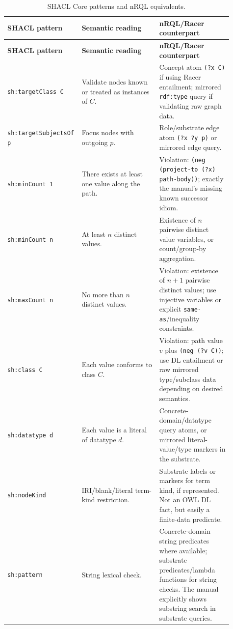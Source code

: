 \documentclass[11pt,letterpaper]{article}
\newcommand{\owl}{OWL}
\begin{document}
\begin{longtable}{p{0.25\linewidth}p{0.34\linewidth}p{0.32\linewidth}}
\caption{SHACL Core patterns and nRQL equivalents.}\label{tab:translation}\\
\toprule
\textbf{SHACL pattern} & \textbf{Semantic reading} & \textbf{nRQL/Racer counterpart} \\
\midrule
\endfirsthead
\toprule
\textbf{SHACL pattern} & \textbf{Semantic reading} & \textbf{nRQL/Racer counterpart} \\
\midrule
\endhead
\bottomrule
\endfoot
\texttt{sh:targetClass C} & Validate nodes known or treated as instances of $C$. & Concept atom \texttt{(?x C)} if using Racer entailment; mirrored \texttt{rdf:type} query if validating raw graph data. \\
\addlinespace
\texttt{sh:targetSubjectsOf p} & Focus nodes with outgoing $p$. & Role/substrate edge atom \texttt{(?x ?y p)} or mirrored edge query. \\
\addlinespace
\texttt{sh:minCount 1} & There exists at least one value along the path. & Violation: \texttt{(neg (project-to (?x) path-body))}; exactly the manual's missing known successor idiom. \\
\addlinespace
\texttt{sh:minCount n} & At least $n$ distinct values. & Existence of $n$ pairwise distinct value variables, or count/group-by aggregation. \\
\addlinespace
\texttt{sh:maxCount n} & No more than $n$ distinct values. & Violation: existence of $n+1$ pairwise distinct values; use injective variables or explicit \texttt{same-as}/inequality constraints. \\
\addlinespace
\texttt{sh:class C} & Each value conforms to class $C$. & Violation: path value $v$ plus \texttt{(neg (?v C))}; use DL entailment or raw mirrored type/subclass data depending on desired semantics. \\
\addlinespace
\texttt{sh:datatype d} & Each value is a literal of datatype $d$. & Concrete-domain/datatype query atoms, or mirrored literal-value/type markers in the substrate. \\
\addlinespace
\texttt{sh:nodeKind} & IRI/blank/literal term-kind restriction. & Substrate labels or markers for term kind, if represented. Not an \owl{} DL fact, but easily a finite-data predicate. \\
\addlinespace
\texttt{sh:pattern} & String lexical check. & Concrete-domain string predicates where available; substrate predicates/lambda functions for string checks. The manual explicitly shows substring search in substrate queries. \\

\end{longtable}
\end{document}
